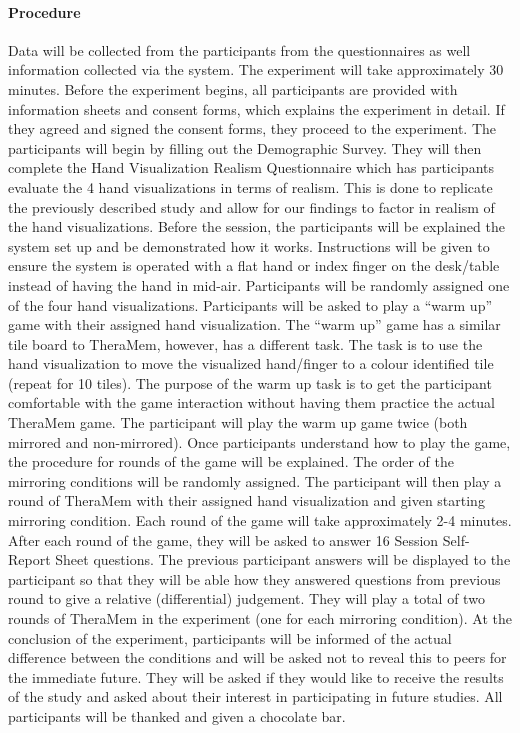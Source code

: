 \paragraph{Procedure}

Data will be collected from the participants from the questionnaires as well information collected via the system. The experiment will take approximately 30 minutes. Before the experiment begins, all participants are provided with information sheets and consent forms, which explains the experiment in detail. If they agreed and signed the consent forms, they proceed to the experiment. The participants will begin by filling out the Demographic Survey. They will then complete the Hand Visualization Realism Questionnaire which has participants evaluate the 4 hand visualizations in terms of realism. This is done to replicate the previously described study and allow for our findings to factor in realism of the hand visualizations.
Before the session, the participants will be explained the system set up and be demonstrated how it works. Instructions will be given to ensure the system is operated with a flat hand or index finger on the desk/table instead of having the hand in mid-air. Participants will be randomly assigned one of the four hand visualizations. Participants will be asked to play a “warm up” game with their assigned hand visualization. The “warm up” game has a similar tile board to TheraMem, however, has a different task. The task is to use the hand visualization to move the visualized hand/finger to a colour identified tile (repeat for 10 tiles). The purpose of the warm up task is to get the participant comfortable with the game interaction without having them practice the actual TheraMem game. The participant will play the warm up game twice (both mirrored and non-mirrored).
Once participants understand how to play the game, the procedure for rounds of the game will be explained. The order of the mirroring conditions will be randomly assigned. The participant will then play a round of TheraMem with their assigned hand visualization and given starting mirroring condition. Each round of the game will take approximately 2-4 minutes. After each round of the game, they will be asked to answer 16 Session Self-Report Sheet questions. The previous participant answers will be displayed to the participant so that they will be able how they answered questions from previous round to give a relative (differential) judgement. They will play a total of two rounds of TheraMem in the experiment (one for each mirroring condition).
At the conclusion of the experiment, participants will be informed of the actual difference between the conditions and will be asked not to reveal this to peers for the immediate future. They will be asked if they would like to receive the results of the study and asked about their interest in participating in future studies. All participants will be thanked and given a chocolate bar. 

